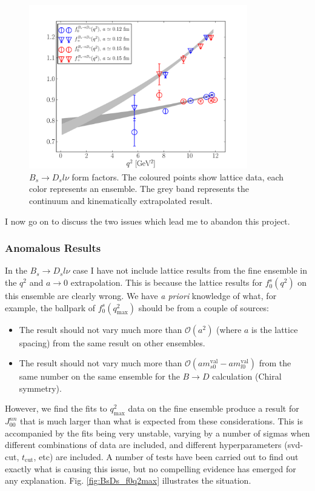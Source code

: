 \begin{figure}[htb!]
  \begin{center}
    \includegraphics[width=0.85\textwidth]{images/nrqcd/BsDs_formfactors.pdf}
  \end{center}
  \caption{$B_s\to D_sl\nu$ form factors. The coloured points show lattice data, each color represents an ensemble. The grey band represents the continuum and kinematically extrapolated result. \label{fig:BsDs_formfactors}}
\end{figure}

I now go on to discuss the two issues which lead me to abandon this project.

\subsubsection{Anomalous Results}

In the $B_s\to D_s l\nu$ case I have not include lattice results from the fine ensemble in the $q^2$ and $a\to 0$ extrapolation. This is because the lattice results for $f_0^s(q^2)$ on this ensemble are clearly wrong. We have {\textit{a priori}} knowledge of what, for example, the ballpark of $f_0^s(q^2_{\text{max}})$ should be from a couple of sources:
\begin{itemize}
\item
The result should not vary much more than $\mathcal{O}(a^2)$ (where $a$ is the lattice spacing) from the same result on other ensembles.
\item
  The result should not vary much more than $\mathcal{O}(am^{\text{val}}_{s0} - am^{\text{val}}_{l0})$ from the same number on the same ensemble for the $B\to D$ calculation (Chiral symmetry).
\end{itemize}
However, we find the fits to $q^2_{\text{max}}$ data on the fine ensemble produce a result for $J^{nn}_{00}$ that is much larger than what is expected from these considerations. This is accompanied by the fits being very unstable, varying by a number of sigmas when different combinations of data are included, and different hyperparameters (svd-cut, $t_{\text{cut}}$, etc) are included. A number of tests have been carried out to find out exactly what is causing this issue, but no compelling evidence has emerged for any explanation. Fig. \ref{fig:BsDs_f0q2max} illustrates the situation.

